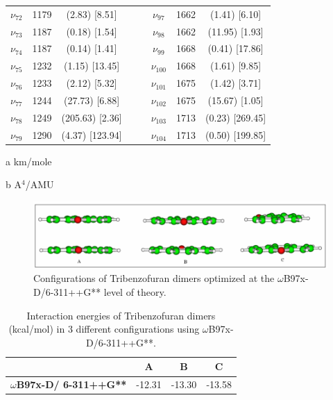 \begin{table}[H]
\begin{center}
\begin{threeparttable}
\begin{tabular}{c c c c c c c c}
	$\nu_{72}$&  1179 & (2.83)  [8.51] &  &  & $\nu_{97}$&  1662 & (1.41)  [6.10] \\ 
	$\nu_{73}$&  1187 & (0.18)  [1.54] &  &  & $\nu_{98}$&  1662 & (11.95)  [1.93] \\ 
	$\nu_{74}$&  1187 & (0.14)  [1.41] &  &  & $\nu_{99}$&  1668 & (0.41)  [17.86] \\ 
	$\nu_{75}$&  1232 & (1.15)  [13.45] &  &  & $\nu_{100}$ & 1668 & (1.61)  [9.85] \\ 
	$\nu_{76}$&  1233 & (2.12)  [5.32] &  &  & $\nu_{101}$&  1675 & (1.42)  [3.71] \\ 
	$\nu_{77}$&  1244 & (27.73)  [6.88] &  &  & $\nu_{102}$&  1675 & (15.67)  [1.05] \\ 
	$\nu_{78}$&  1249 & (205.63) [2.36] &  &  & $\nu_{103}$&  1713 & (0.23)  [269.45] \\ 
	$\nu_{79}$&  1290 & (4.37)  [123.94] &  &  & $\nu_{104}$&  1713 & (0.50)  [199.85] \\ 			
		\bottomrule
\end{tabular}

\begin{tablenotes}
	\item[a] km/mole
	\item[b] A$^{4}$/AMU
\end{tablenotes}
\end{threeparttable}
\end{center}
\label{freqDibenfDi}
\end{table}
				
				
				
				

\begin{figure}[H]
	\begin{center}
		\includegraphics[scale=0.9]{anex/image/tribenzof-dim}
	\end{center}
	\caption{Configurations of Tribenzofuran dimers optimized at the $\omega$B97x-D/6-311++G** level of theory.}
\end{figure}


\begin{table}[htbp]
	\caption{Interaction energies of Tribenzofuran dimers (kcal/mol) in 3 different configurations using $\omega$B97x-D/6-311++G**.}
	\begin{center}
		\begin{tabular}{cccc}
			\toprule
			& \textbf{A} & \textbf{B} & \textbf{C} \\ 
			\midrule
			\textbf{$\omega$B97x-D/
				6-311++G** }& -12.31	& -13.30	& -13.58	\\ 
			\bottomrule
		\end{tabular}
	\end{center}
	\label{}
\end{table}


